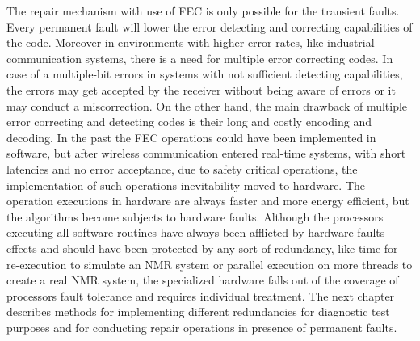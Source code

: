 The repair mechanism with use of FEC is only possible for the transient faults. Every permanent fault will lower the error detecting and correcting capabilities of the code. Moreover in environments with higher error rates, like industrial communication systems, there is a need for multiple error correcting codes. In case of a multiple-bit errors in systems with not sufficient detecting capabilities, the errors may get accepted by the receiver without being aware of errors or it may conduct a miscorrection. On the other hand, the main drawback of multiple error correcting and detecting codes is their long and costly encoding and decoding. In the past the FEC operations could have been implemented in software, but after wireless communication entered real-time systems, with short latencies and no error acceptance, due to safety critical operations, the implementation of such operations inevitability moved to hardware. The operation executions in hardware are always faster and more energy efficient, but the algorithms become subjects to hardware faults. Although the processors executing all software routines have always been afflicted by hardware faults effects and should have been protected by any sort of redundancy, like time for re-execution to simulate an NMR system or parallel execution on more threads to create a real NMR system, the specialized hardware falls out of the coverage of processors fault tolerance and requires individual treatment. The next chapter describes methods for implementing different redundancies for diagnostic test purposes and for conducting repair operations in presence of permanent faults.

